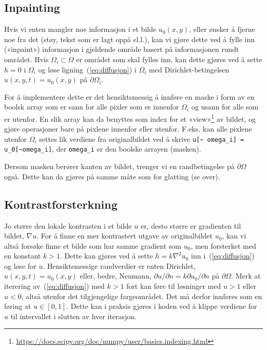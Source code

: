 \documentclass[11pt,a4paper]{article}
\begin{document}
\subsection{Inpainting}
\label{sec:inpainting}

Hvis vi enten mangler noe informasjon i et bilde $u_0(x, y)$, eller
ønsker å fjerne noe fra det (støy, tekst som er lagt oppå el.l.), kan
vi gjøre dette ved å fylle inn («inpaint») informasjon i gjeldende
område basert på informasjonen rundt området. Hvis
$\Omega_i \subset \Omega$ er området som skal fylles inn, kan dette
gjøres ved å sette $h = 0$ i $\Omega_i$ og løse
ligning~(\ref{eq:diffusjon}) i $\Omega_i$ med Dirichlet-betingelsen
$u(x, y, t) = u_0(x, y)$ på $\partial\Omega_i$.

For å implementere dette er det hensiktsmessig å innføre en maske i
form av en boolsk array som er sann for alle pixler som er innenfor
$\Omega_i$ og usann for alle som er utenfor. En slik array kan da
benyttes som index for et
«view»\footnote{\url{https://docs.scipy.org/doc/numpy/user/basics.indexing.html}}
av bildet, og gjøre operasjoner bare på pixlene innenfor eller
utenfor. F.eks. kan alle pixlene utenfor $\Omega_i$ settes lik
verdiene fra originalbildet ved å skrive \texttt{u[\textasciitilde
  omega\_i] = u\_0[\textasciitilde omega\_i]}, der \texttt{omega\_i}
er den boolske arrayen (masken).

Dersom masken berører kanten av bildet, trenger vi en randbetingelse
på $\partial\Omega$ også. Dette kan da gjøres på samme måte som for
glatting (se over).

\subsection{Kontrastforsterkning}
\label{sec:kontrastforsterkning}

Jo større den lokale kontrasten i et bilde $u$ er, desto større er
gradienten til bildet, $\nabla u$. For å finne en mer kontrastert
utgave av originalbildet $u_0$, kan vi altså forsøke finne et bilde
som har samme gradient som $u_0$, men forsterket med en konstant
$k > 1$. Dette kan gjøres ved å sette $h = k\nabla^2 u_0$ inn
i~(\ref{eq:diffusjon}) og løse for $u$. Hensiktsmessige randverdier er
enten Dirichlet, $u(x, y, t) = u_0(x, y)$ eller, bedre, Neumann,
$\partial u/\partial n = k\partial u_0/\partial n$ på
$\partial\Omega$. Merk at iterering av~(\ref{eq:diffusjon}) med
$k > 1$ fort kan føre til løsninger med $u > 1$ eller $u < 0$, altså
utenfor det tilgjengelige fargeområdet. Det må derfor innføres som en
føring at $u \in [0, 1]$. Dette kan i praksis gjøres i koden ved å
klippe verdiene for $u$ til intervallet i slutten av hver iterasjon.
\end{document}
